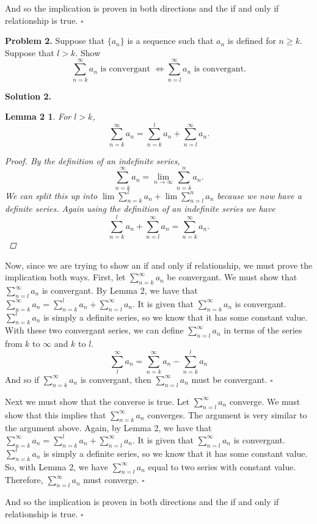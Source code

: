 \documentclass[12pt,letterpaper]{article}
\newtheorem*{lemma2}{Lemma 2}
\begin{document}
And so the implication is proven in both directions and the if and only if relationship is true.
\hfill$\square$

{\bf Problem 2.} Suppose that $\{a_n\}$ is a sequence such that $a_n$ is defined for $n \geq k$. Suppose that $l>k$. Show
\[
\sum_{n=k}^\infty a_n \mbox{ is convergant } \iff \sum_{n=l}^\infty a_n \mbox { is convergant.}
\]

{\bf Solution 2.} 
\begin{lemma2} For $l>k$,
\[
\sum_{n=k}^\infty a_n = \sum_{n=k}^l a_n + \sum_{n=l}^\infty a_n.
\]
\begin{proof}
By the definition of an indefinite series,
\[
\sum_{n=k}^\infty a_n = \lim_{n \to \infty} \sum_{n=k}^n a_n.
\]
We can split this up into $\lim \sum_{n=k}^l a_n + \lim \sum_{n=l}^n a_n$ because we now have a definite series. Again using the definition of an indefinite series we have
\[
\sum_{n=k}^l a_n + \sum_{n=l}^\infty a_n = \sum_{n=k}^\infty a_n.
\]
\end{proof}
\end{lemma2}

Now, since we are trying to show an if and only if relationship, we must prove the implication both ways. First, let $\sum_{n=k}^\infty a_n$ be convergant. We must show that $\sum_{n=l}^\infty a_n$ is convergant. By Lemma 2, we have that $\sum_{n=k}^\infty a_n = \sum_{n=k}^l a_n + \sum_{n=l}^\infty a_n.$ It is given that $\sum_{n=k}^\infty a_n$ is convergant. $\sum_{n=k}^l a_n$ is simply a definite series, so we know that it has some constant value. With these two convergant series, we can define $\sum_{n=l}^\infty a_n$ in terms of the series from $k$ to $\infty$ and $k$ to $l$.
\[
\sum_l^\infty a_n = \sum_{n=k}^\infty a_n - \sum_{n=k}^l a_n
\]
And so if $\sum_{n=k}^\infty a_n$ is convergant, then $\sum_{n=l}^\infty a_n$ must be convergant.
\hfill$\square$

Next we must show that the converse is true. Let $\sum_{n=l}^\infty a_n$ converge. We must show that this implies that $\sum_{n=k}^\infty a_n$ converges. The argument is very similar to the argument above. Again, by Lemma 2, we have that $\sum_{n=k}^\infty a_n = \sum_{n=k}^l a_n + \sum_{n=l}^\infty a_n$. It is given that $\sum_{n=l}^\infty a_n$ is convergant. $\sum_{n=k}^l a_n$ is simply a definite series, so we know that it has some constant value. So, with Lemma 2, we have $\sum_{n=l}^\infty a_n$ equal to two series with constant value. Therefore, $\sum_{n=l}^\infty a_n$ must converge.
\hfill$\square$

And so the implication is proven in both directions and the if and only if relationship is true.
\hfill$\square$



\end{document}
